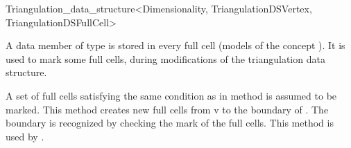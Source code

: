 \begin{ccRefClass}{Triangulation_data_structure<Dimensionality, TriangulationDSVertex, TriangulationDSFullCell>}
\begin{ccAdvanced}

\ccTypes

{A data member of type  is stored in every full cell (models
of the concept ).  It is used to mark
some 
full cells, during modifications of the triangulation data structure.}


{A set  of full cells satisfying the same condition as in method
\ccRefName{} is assumed to be marked. This
method creates new full cells from  v to the boundary of .
The boundary is recognized by checking the mark of the full cells.
This method is used by \ccRefName{}.}

\end{ccAdvanced}

\end{ccRefClass}
